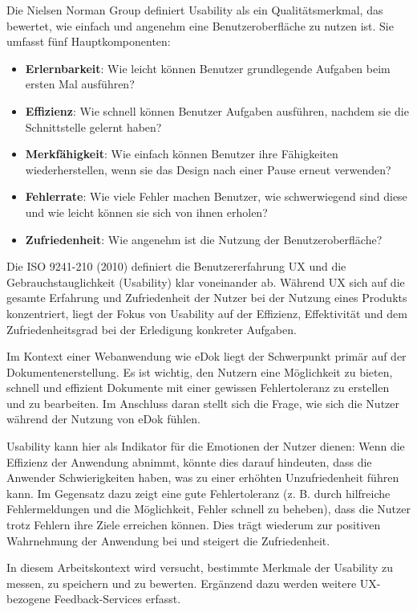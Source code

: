 \documentclass[12pt,oneside]{article}
\begin{document}
Die Nielsen Norman Group definiert \cite{nngroup} Usability als ein Qualitätsmerkmal, das bewertet, wie einfach und angenehm eine Benutzeroberfläche zu nutzen ist. Sie umfasst fünf Hauptkomponenten:
\begin{itemize}
    \item \textbf{Erlernbarkeit}: Wie leicht können Benutzer grundlegende Aufgaben beim ersten Mal ausführen?
    \item \textbf{Effizienz}: Wie schnell können Benutzer Aufgaben ausführen, nachdem sie die Schnittstelle gelernt haben?
    \item \textbf{Merkfähigkeit}: Wie einfach können Benutzer ihre Fähigkeiten wiederherstellen, wenn sie das Design nach einer Pause erneut verwenden?
    \item \textbf{Fehlerrate}: Wie viele Fehler machen Benutzer, wie schwerwiegend sind diese und wie leicht können sie sich von ihnen erholen?
    \item \textbf{Zufriedenheit}: Wie angenehm ist die Nutzung der Benutzeroberfläche?
\end{itemize}
Die ISO 9241-210 (2010) definiert die Benutzererfahrung UX und die Gebrauchstauglichkeit (Usability) klar voneinander ab. Während UX sich auf die gesamte Erfahrung und Zufriedenheit der Nutzer bei der Nutzung eines Produkts konzentriert, liegt der Fokus von Usability auf der Effizienz, Effektivität und dem Zufriedenheitsgrad bei der Erledigung konkreter Aufgaben.

Im Kontext einer Webanwendung wie eDok liegt der Schwerpunkt primär auf der Dokumentenerstellung. Es ist wichtig, den Nutzern eine Möglichkeit zu bieten, schnell und effizient Dokumente mit einer gewissen Fehlertoleranz zu erstellen und zu bearbeiten. Im Anschluss daran stellt sich die Frage, wie sich die Nutzer während der Nutzung von eDok fühlen.

Usability kann hier als Indikator für die Emotionen der Nutzer dienen: Wenn die Effizienz der Anwendung abnimmt, könnte dies darauf hindeuten, dass die Anwender Schwierigkeiten haben, was zu einer erhöhten Unzufriedenheit führen kann. Im Gegensatz dazu zeigt eine gute Fehlertoleranz (z. B. durch hilfreiche Fehlermeldungen und die Möglichkeit, Fehler schnell zu beheben), dass die Nutzer trotz Fehlern ihre Ziele erreichen können. Dies trägt wiederum zur positiven Wahrnehmung der Anwendung bei und steigert die Zufriedenheit.

In diesem Arbeitskontext wird versucht, bestimmte Merkmale der Usability zu messen, zu speichern und zu bewerten. Ergänzend dazu werden weitere UX-bezogene Feedback-Services erfasst.
\end{document}
